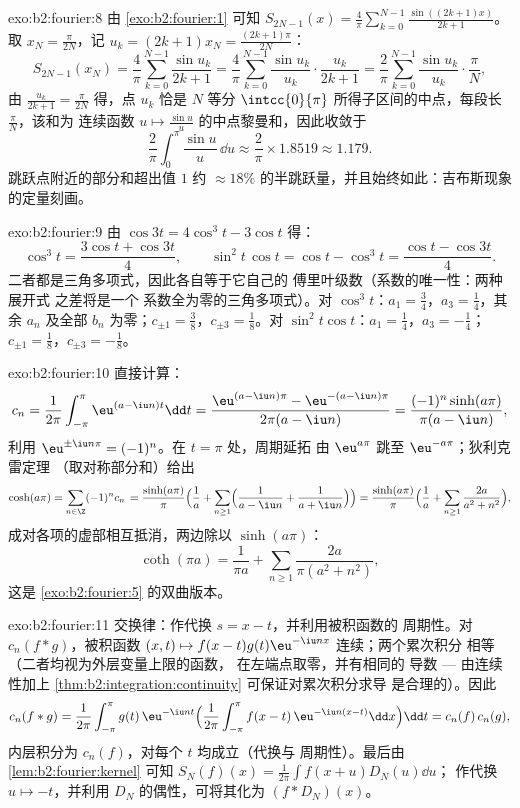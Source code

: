 \begin{solution}{exo:b2:fourier:8}
由 \cref{exo:b2:fourier:1} 可知 $S_{2N-1}(x) =
\frac4\pi\sum_{k=0}^{N-1}\frac{\sin((2k+1)x)}{2k+1}$。取 $x_N =
\frac{\pi}{2N}$，记 $u_k = (2k+1)x_N = \frac{(2k+1)\pi}{2N}$：
\[
S_{2N-1}(x_N) = \frac{4}{\pi}\sum_{k=0}^{N-1}\frac{\sin u_k}{2k+1}
= \frac{4}{\pi}\sum_{k=0}^{N-1}\frac{\sin u_k}{u_k}\cdot
\frac{u_k}{2k+1}
= \frac{2}{\pi}\sum_{k=0}^{N-1}\frac{\sin u_k}{u_k}\cdot
\frac{\pi}{N},
\]
由 $\frac{u_k}{2k+1} = \frac{\pi}{2N}$ 得，点 $u_k$ 恰是 $N$
等分 $\intcc{0}{\pi}$ 所得子区间的中点，每段长
$\frac{\pi}{N}$，该和为
连续函数 $u \mapsto \frac{\sin u}{u}$ 的中点黎曼和，因此收敛于
\[
\frac{2}{\pi}\int_0^\pi \frac{\sin u}{u}\,\dd u
\approx \frac{2}{\pi}\times 1.8519 \approx 1.179 .
\]
跳跃点附近的部分和超出值 $1$ 约 $\approx
18\%$ 的半跳跃量，并且始终如此：吉布斯现象的定量刻画。
\end{solution}

\begin{solution}{exo:b2:fourier:9}
由 $\cos 3t = 4\cos^3t - 3\cos t$ 得：
\[
\cos^3 t = \frac{3\cos t + \cos 3t}{4},
\qquad
\sin^2t\,\cos t = \cos t - \cos^3 t
= \frac{\cos t - \cos 3t}{4} .
\]
二者都是三角多项式，因此各自等于它自己的
傅里叶级数（系数的唯一性：两种展开式
之差将是一个
系数全为零的三角多项式）。对 $\cos^3t$：$a_1 = \frac34$，$a_3 =
\frac14$，其余 $a_n$ 及全部 $b_n$ 为零；$c_{\pm1} =
\frac38$，$c_{\pm3} = \frac18$。对 $\sin^2t\cos t$：$a_1 =
\frac14$，$a_3 = -\frac14$；$c_{\pm1} = \frac18$，$c_{\pm3} =
-\frac18$。
\end{solution}

\begin{solution}{exo:b2:fourier:10}
直接计算：
\[
c_n = \frac{1}{2\pi}\int_{-\pi}^{\pi}\eu^{(a - \iu n)t}\dd t
= \frac{\eu^{(a-\iu n)\pi} - \eu^{-(a - \iu n)\pi}}
{2\pi(a - \iu n)}
= \frac{(-1)^n\sinh(a\pi)}{\pi(a - \iu n)} ,
\]
利用 $\eu^{\pm\iu n\pi} = (-1)^n$。在 $t = \pi$ 处，周期延拓
由 $\eu^{a\pi}$ 跳至 $\eu^{-a\pi}$；狄利克雷定理
（取对称部分和）给出
\[
\cosh(a\pi) = \sum_{n\in\Z}(-1)^n c_n\,
= \frac{\sinh(a\pi)}{\pi}\Bigl(\frac1a +
\sum_{n\geq1}\Bigl(\frac{1}{a - \iu n} +
\frac{1}{a + \iu n}\Bigr)\Bigr)
= \frac{\sinh(a\pi)}{\pi}\Bigl(\frac1a +
\sum_{n\geq1}\frac{2a}{a^2 + n^2}\Bigr) ,
\]
成对各项的虚部相互抵消，两边除以
$\sinh(a\pi)$：
\[
\coth(\pi a) = \frac{1}{\pi a} +
\sum_{n\geq1}\frac{2a}{\pi(a^2 + n^2)} ,
\]
这是 \cref{exo:b2:fourier:5} 的双曲版本。
\end{solution}

\begin{solution}{exo:b2:fourier:11}
交换律：作代换 $s = x - t$，并利用被积函数的
周期性。对 $c_n(f * g)$，被积函数 $(x, t) \mapsto
f(x-t)g(t)\eu^{-\iu nx}$ 连续；两个累次积分
相等（二者均视为外层变量上限的函数，
在左端点取零，并有相同的
导数 --- 由连续性加上
\cref{thm:b2:integration:continuity} 可保证对累次积分求导
是合理的）。因此
\[
c_n(f*g) = \frac{1}{2\pi}\int_{-\pi}^{\pi} g(t)\,\eu^{-\iu nt}
\Bigl(\frac{1}{2\pi}\int_{-\pi}^{\pi}
f(x-t)\,\eu^{-\iu n(x-t)}\dd x\Bigr)\dd t
= c_n(f)\,c_n(g),
\]
内层积分为 $c_n(f)$，对每个 $t$ 均成立（代换与
周期性）。最后由 \cref{lem:b2:fourier:kernel} 可知
$S_N(f)(x) = \frac{1}{2\pi}\int f(x+u)D_N(u)\dd u$；
作代换 $u \mapsto -t$，并利用 $D_N$ 的偶性，可将其化为
$(f * D_N)(x)$。
\end{solution}

